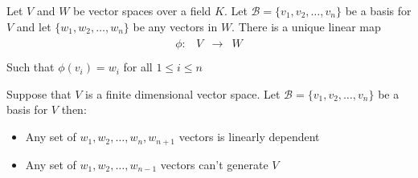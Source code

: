 \documentclass[final,expand]{problemset}
\begin{document}

\problem
Let $V$ and $W$ be vector spaces over a field $K$. Let $\mathcal{B} = \{v_1, v_2, \dots,
	v_n\}$ be a basis for $V$ and let $\{w_1, w_2, \dots, w_n\}$ be any
vectors in
$W$. There is a unique linear map \begin{align*}
	\begin{matrix}
		\phi: & V & \to & W \\
	\end{matrix}
\end{align*}
Such that $\phi(v_i) = w_i$ for all $1 \le i \le n$


\problem
Suppose that $V$ is a finite dimensional vector space. Let $\mathcal{B} = \{v_1, v_2, \dots, v_n\}$ be a basis for $V$ then:
\begin{itemize}
	\item Any set of $w_1, w_2, \dots, w_n, w_{n+1}$ vectors is linearly dependent
	\item Any set of $w_1, w_2, \dots, w_{n-1}$ vectors can't generate $V$
\end{itemize}
\end{document}
